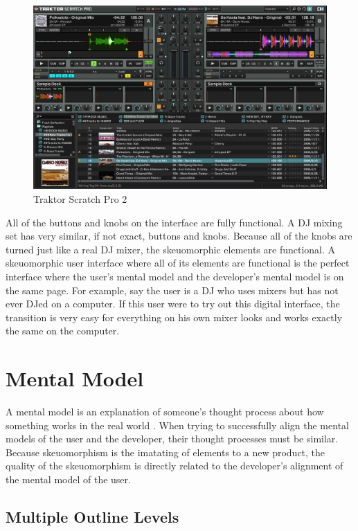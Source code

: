 \documentclass{article}
\begin{document}
\begin{figure}[H]
\centering
\includegraphics[width=4.5in]{traktorUI.jpg} 

\caption{Traktor Scratch Pro 2}
\label{traktor}
\end{figure}

All of the buttons and knobs on the interface are fully functional.  A DJ mixing set has very similar, if not exact, buttons and knobs.  Because all of the knobs are turned just like a real DJ mixer, the skeuomorphic elements are functional.  A skeuomorphic user interface where all of its elements are functional is the perfect interface where the user's mental model and the developer's mental model is on the same page.  For example, say the user is a DJ who uses mixers but has not ever DJed on a computer.  If this user were to try out this digital interface, the transition is very easy for everything on his own mixer looks and works exactly the same on the computer.

\section{Mental Model}

A mental model is an explanation of someone's thought process about how something works in the real world \cite{wiki-mental}.  When trying to successfully align the mental models of the user and the developer, their thought processes must be similar.  Because skeuomorphism is the imatating of elements to a new product, the quality of the skeuomorphism is directly related to the developer's alignment of the mental model of the user.


\subsection{Multiple Outline Levels}
\end{document}
